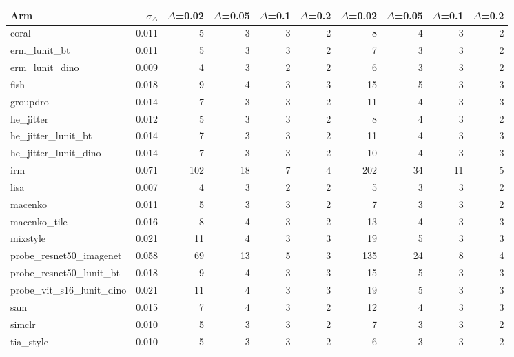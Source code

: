 \begin{tabular}{lrrrrrrrrr}
\toprule
Arm & $\sigma_\Delta$ & $\Delta$=0.02 & $\Delta$=0.05 & $\Delta$=0.1 & $\Delta$=0.2 & $\Delta$=0.02 & $\Delta$=0.05 & $\Delta$=0.1 & $\Delta$=0.2 \\
\midrule
coral & 0.011 & 5 & 3 & 3 & 2 & 8 & 4 & 3 & 2 \\
erm\_lunit\_bt & 0.011 & 5 & 3 & 3 & 2 & 7 & 3 & 3 & 2 \\
erm\_lunit\_dino & 0.009 & 4 & 3 & 2 & 2 & 6 & 3 & 3 & 2 \\
fish & 0.018 & 9 & 4 & 3 & 3 & 15 & 5 & 3 & 3 \\
groupdro & 0.014 & 7 & 3 & 3 & 2 & 11 & 4 & 3 & 3 \\
he\_jitter & 0.012 & 5 & 3 & 3 & 2 & 8 & 4 & 3 & 2 \\
he\_jitter\_lunit\_bt & 0.014 & 7 & 3 & 3 & 2 & 11 & 4 & 3 & 3 \\
he\_jitter\_lunit\_dino & 0.014 & 7 & 3 & 3 & 2 & 10 & 4 & 3 & 3 \\
irm & 0.071 & 102 & 18 & 7 & 4 & 202 & 34 & 11 & 5 \\
lisa & 0.007 & 4 & 3 & 2 & 2 & 5 & 3 & 3 & 2 \\
macenko & 0.011 & 5 & 3 & 3 & 2 & 7 & 3 & 3 & 2 \\
macenko\_tile & 0.016 & 8 & 4 & 3 & 2 & 13 & 4 & 3 & 3 \\
mixstyle & 0.021 & 11 & 4 & 3 & 3 & 19 & 5 & 3 & 3 \\
probe\_resnet50\_imagenet & 0.058 & 69 & 13 & 5 & 3 & 135 & 24 & 8 & 4 \\
probe\_resnet50\_lunit\_bt & 0.018 & 9 & 4 & 3 & 3 & 15 & 5 & 3 & 3 \\
probe\_vit\_s16\_lunit\_dino & 0.021 & 11 & 4 & 3 & 3 & 19 & 5 & 3 & 3 \\
sam & 0.015 & 7 & 4 & 3 & 2 & 12 & 4 & 3 & 3 \\
simclr & 0.010 & 5 & 3 & 3 & 2 & 7 & 3 & 3 & 2 \\
tia\_style & 0.010 & 5 & 3 & 3 & 2 & 6 & 3 & 3 & 2 \\
\bottomrule
\end{tabular}

